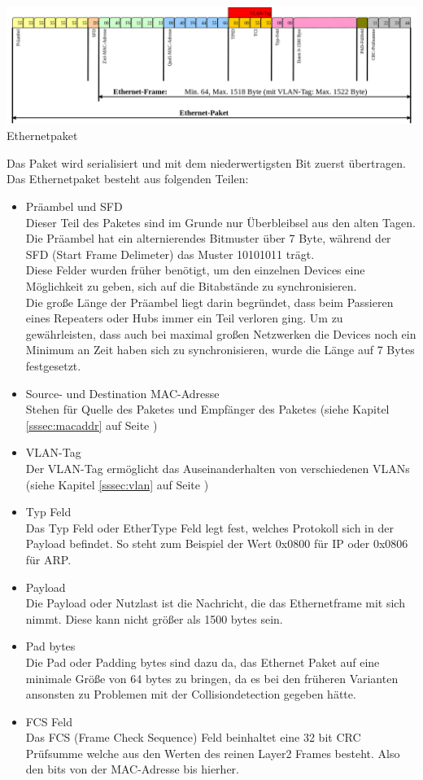 \documentclass[12pt,a4paper]{report}
\begin{document}
\begin{center}
\includegraphics[scale=0.35]{../docs/tarkes/pics/Ethernetpaket.png}
Ethernetpaket
\end{center}

Das Paket wird serialisiert und mit dem niederwertigsten Bit zuerst übertragen. Das Ethernetpaket besteht aus folgenden Teilen:
\begin{itemize}
\item Präambel und SFD\\
Dieser Teil des Paketes sind im Grunde nur Überbleibsel aus den alten Tagen. Die Präambel hat ein alternierendes Bitmuster über 7 Byte, während der SFD (Start Frame Delimeter) das Muster 10101011 trägt.\\
Diese Felder wurden früher benötigt, um den einzelnen Devices eine Möglichkeit zu geben, sich auf die Bitabstände zu synchronisieren.\\
Die große Länge der Präambel liegt darin begründet, dass beim Passieren eines Repeaters oder Hubs immer ein Teil verloren ging. Um zu gewährleisten, dass auch bei maximal großen Netzwerken die Devices noch ein Minimum an Zeit haben sich zu synchronisieren, wurde die Länge auf 7 Bytes festgesetzt. 
\item Source- und Destination MAC-Adresse\\
Stehen für Quelle des Paketes und Empfänger des Paketes (siehe Kapitel \ref{sssec:macaddr} auf Seite \pageref{sssec:macaddr})
\item VLAN-Tag\\
Der VLAN-Tag ermöglicht das Auseinanderhalten von verschiedenen VLANs (siehe Kapitel \ref{sssec:vlan} auf Seite \pageref{sssec:vlan})
\item Typ Feld\\
Das Typ Feld oder EtherType Feld legt fest, welches Protokoll sich in der Payload befindet. So steht zum Beispiel der Wert 0x0800 für IP oder 0x0806 für ARP.
\item Payload\\
Die Payload oder Nutzlast ist die Nachricht, die das Ethernetframe mit sich nimmt. Diese kann nicht größer als 1500 bytes sein.
\item Pad bytes\\
Die Pad oder Padding bytes sind dazu da, das Ethernet Paket auf eine minimale Größe von 64 bytes zu bringen, da es bei den früheren Varianten ansonsten zu Problemen mit der Collisiondetection gegeben hätte.
\item FCS Feld\\
Das FCS (Frame Check Sequence) Feld beinhaltet eine 32 bit CRC Prüfsumme welche aus den Werten des reinen Layer2 Frames besteht. Also den bits von der MAC-Adresse bis hierher.
\end{itemize}
\end{document}
